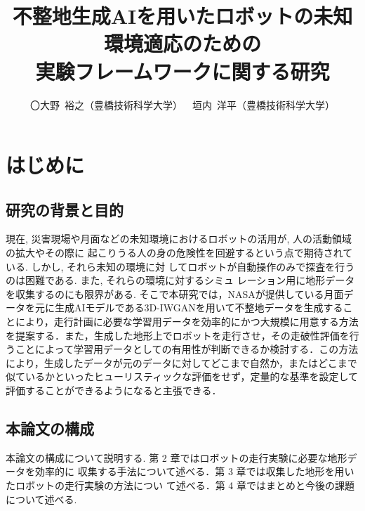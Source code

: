 \documentclass[uplatex,twocolumn, dvipdfmx]{jsarticle}  %
\begin{document}
\title{不整地生成AIを用いたロボットの未知環境適応のための\\実験フレームワークに関する研究}
\author{〇大野\ 裕之（豊橋技術科学大学）\ \ 垣内\ 洋平（豊橋技術科学大学）}
\setlength{\baselineskip}{4.4mm}	%
\maketitle
\thispagestyle{empty}
\pagestyle{empty}

\section{はじめに}
\subsection{研究の背景と目的}
現在, 災害現場や月面などの未知環境におけるロボットの活用が, 人の活動領域の拡大やその際に
起こりうる人の身の危険性を回避するという点で期待されている. しかし, それら未知の環境に対
してロボットが自動操作のみで探査を行うのは困難である. \cite{bunken1} また, それらの環境に対するシミュ
レーション用に地形データを収集するのにも限界がある. \cite{bunken2} そこで本研究では，NASAが提供している月面データを元に生成AIモデルである3D-IWGANを用いて不整地データを生成することにより，走行計画に必要な学習用データを効率的にかつ大規模に用意する方法を提案する．また，生成した地形上でロボットを走行させ，その走破性評価を行うことによって学習用データとしての有用性が判断できるか検討する．この方法により，生成したデータが元のデータに対してどこまで自然か，またはどこまで似ているかといったヒューリスティックな評価をせず，定量的な基準を設定して評価することができるようになると主張できる．

\subsection{本論文の構成}
本論文の構成について説明する. 第 2 章ではロボットの走行実験に必要な地形データを効率的に
収集する手法について述べる．第 3 章では収集した地形を用いたロボットの走行実験の方法につい
て述べる．第 4 章ではまとめと今後の課題について述べる.
\end{document}
